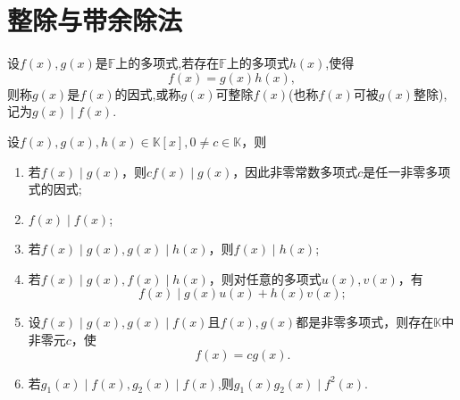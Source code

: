 \documentclass[../../main.tex]{subfiles}%
\begin{document}
\section{整除与带余除法}

\begin{definition}[整除的定义]\label{definition:整除的定义}
设\(f(x),g(x)\)是\(\mathbb{F}\)上的多项式,若存在\(\mathbb{F}\)上的多项式\(h(x)\),使得
\[
f(x)=g(x)h(x),
\]
则称\(g(x)\)是\(f(x)\)的因式,或称\(g(x)\)可整除\(f(x)\)(也称\(f(x)\)可被\(g(x)\)整除),记为\(g(x)\mid f(x)\).
\end{definition}

\begin{proposition}[整除的基本性质]\label{proposition:整除的基本性质}
设\(f(x),g(x),h(x)\in\mathbb{K}[x],0\neq c\in\mathbb{K}\)，则
\begin{enumerate}[(1)]
\item 若\(f(x)\mid g(x)\)，则\(cf(x)\mid g(x)\)，因此非零常数多项式\(c\)是任一非零多项式的因式;

\item  \(f(x)\mid f(x)\);

\item 若\(f(x)\mid g(x),g(x)\mid h(x)\)，则\(f(x)\mid h(x)\);

\item 若\(f(x)\mid g(x),f(x)\mid h(x)\)，则对任意的多项式\(u(x),v(x)\)，有
\[
f(x)\mid g(x)u(x)+h(x)v(x);
\]

\item 设\(f(x)\mid g(x),g(x)\mid f(x)\)且\(f(x),g(x)\)都是非零多项式，则存在\(\mathbb{K}\)中非零元\(c\)，使
\[
f(x)=cg(x).
\]

\item 若$g_1(x)\mid f(x),g_2(x)\mid f(x)$,则$g_1(x)g_2(x)\mid f^2(x)$.
\end{enumerate}
\end{proposition}
\end{document}
